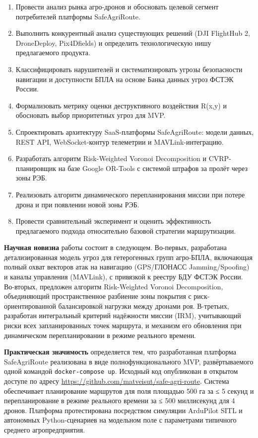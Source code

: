 \begin{enumerate}
\def\labelenumi{\arabic{enumi}.}
\tightlist
\item
  Провести анализ рынка агро-дронов и обосновать целевой сегмент потребителей платформы SafeAgriRoute.
\item
  Выполнить конкурентный анализ существующих решений (DJI FlightHub 2, DroneDeploy, Pix4Dfields) и определить технологическую нишу предлагаемого продукта.
\item
  Классифицировать нарушителей и систематизировать угрозы безопасности навигации и доступности БПЛА на основе Банка данных угроз ФСТЭК России.
\item
  Формализовать метрику оценки деструктивного воздействия R(x,y) и обосновать выбор приоритетных угроз для MVP.
\item
  Спроектировать архитектуру SaaS-платформы SafeAgriRoute: модели данных, REST API, WebSocket-контур телеметрии и MAVLink-интеграцию.
\item
  Разработать алгоритм Risk-Weighted Voronoi Decomposition и CVRP-планировщик на базе Google OR-Tools с системой штрафов за пролёт через зоны РЭБ.
\item
  Реализовать алгоритм динамического перепланирования миссии при потере дрона и при появлении новой зоны РЭБ.
\item
  Провести сравнительный эксперимент и оценить эффективность предлагаемого подхода относительно базовой стратегии маршрутизации.
\end{enumerate}

\textbf{Научная новизна} работы состоит в следующем. Во-первых, разработана детализированная модель угроз для гетерогенных групп агро-БПЛА, включающая полный охват векторов атак на навигацию (GPS/ГЛОНАСС Jamming/Spoofing) и каналы управления (MAVLink), с привязкой к реестру БДУ ФСТЭК России. Во-вторых, предложен алгоритм Risk-Weighted Voronoi Decomposition, объединяющий пространственное разбиение зоны покрытия с риск-ориентированной балансировкой нагрузки между дронами роя. В-третьих, разработан интегральный критерий надёжности миссии (IRM), учитывающий риски всех запланированных точек маршрута, и механизм его обновления при динамическом перепланировании в режиме реального времени.

\textbf{Практическая значимость} определяется тем, что разработанная платформа SafeAgriRoute реализована в виде полнофункционального MVP, развёртываемого одной командой \texttt{docker-compose\ up}. Исходный код опубликован в открытом доступе по адресу \url{https://github.com/matveisut/safe-agri-route}. Система обеспечивает планирование маршрутов для поля площадью 500 га за ≤ 5 секунд и перепланирование в режиме реального времени за ≤ 500 миллисекунд для 4 дронов. Платформа протестирована посредством симуляции ArduPilot SITL и автономных Python-сценариев на модельном поле с параметрами типичного среднего агропредприятия.

